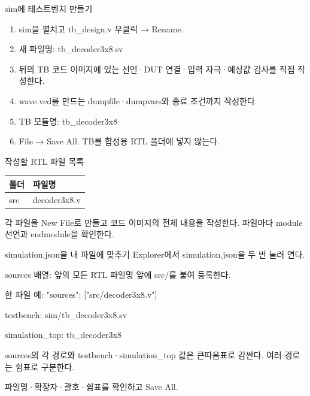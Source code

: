 \begin{frame}{sim에 테스트벤치 만들기}\relax
\small
\begin{enumerate}\setlength{\itemsep}{0.22cm}
\item sim을 펼치고 tb\_design.v 우클릭 → Rename.
\item 새 파일명: tb\_decoder3x8.sv
\item 뒤의 TB 코드 이미지에 있는 선언·DUT 연결·입력 자극·예상값 검사를 직접 작성한다.
\item wave.vcd를 만드는 dumpfile·dumpvars와 종료 조건까지 작성한다.
\item TB 모듈명: tb\_decoder3x8
\item File → Save All. TB를 합성용 RTL 폴더에 넣지 않는다.
\end{enumerate}

\end{frame}

\begin{frame}{작성할 RTL 파일 목록}\relax
\small
\begin{center}\renewcommand{\arraystretch}{1.45}
\begin{tabular}{l|l}
폴더 & 파일명\\\hline
src & decoder3x8.v\\
\end{tabular}\end{center}
각 파일을 New File로 만들고 코드 이미지의 전체 내용을 작성한다. 파일마다 module 선언과 endmodule을 확인한다.\par
\end{frame}

\begin{frame}{simulation.json을 내 파일에 맞추기}\relax
\small
Explorer에서 simulation.json을 두 번 눌러 연다.\par\vspace{0.22cm}sources 배열: 앞의 모든 RTL 파일명 앞에 src/를 붙여 등록한다.\par\vspace{0.22cm}한 파일 예: "sources": ["src/decoder3x8.v"]\par\vspace{0.22cm}testbench: sim/tb\_decoder3x8.sv\par\vspace{0.22cm}simulation\_top: tb\_decoder3x8\par\vspace{0.22cm}sources의 각 경로와 testbench·simulation\_top 값은 큰따옴표로 감싼다. 여러 경로는 쉼표로 구분한다.\par\vspace{0.22cm}파일명·확장자·괄호·쉼표를 확인하고 Save All.\par
\end{frame}

